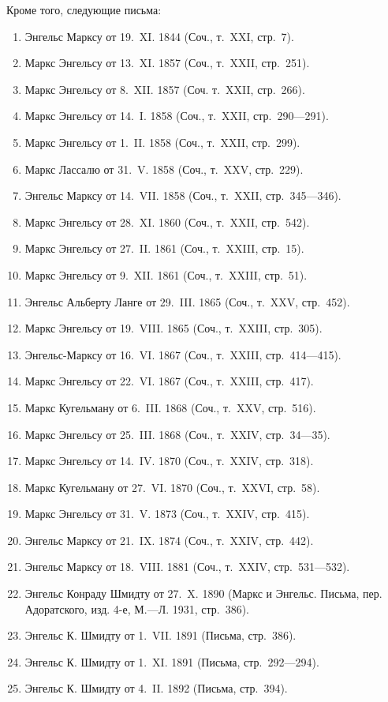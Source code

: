 Кроме того, следующие письма:
\begin{enumerate}
\item Энгельс Марксу от 19.~XI. 1844 (Соч., т.~XXI, стр.~7).
\item Маркс Энгельсу от 13.~XI. 1857 (Соч., т.~XXII, стр.~251).
\item Маркс Энгельсу от 8.~XII. 1857 (Соч. т.~XXII, стр.~266).
\item Маркс Энгельсу от 14.~I. 1858 (Соч., т.~XXII, стр.~290---291).
\item Маркс Энгельсу от 1.~II. 1858 (Соч., т.~XXII, стр.~299).
\item Маркс Лассалю от 31.~V. 1858 (Соч., т.~XXV, стр.~229).
\item Энгельс Марксу от 14.~VII. 1858 (Соч., т.~XXII, стр.~345---346).
\item Маркс Энгельсу от 28.~XI. 1860 (Соч., т.~XXII, стр.~542).
\item Маркс Энгельсу от 27.~II. 1861 (Соч., т.~XXIII, стр.~15).
\item Маркс Энгельсу от 9.~XII. 1861 (Соч., т.~XXIII, стр.~51).
\item Энгельс Альберту Ланге от 29.~III. 1865 (Соч., т.~XXV, стр.~452).
\item Маркс Энгельсу от 19.~VIII. 1865 (Соч., т.~XXIII, стр.~305).
\item Энгельс-Марксу от 16.~VI. 1867 (Соч., т.~XXIII, стр.~414---415).
\item Маркс Энгельсу от 22.~VI. 1867 (Соч., т.~XXIII, стр.~417).
\item Маркс Кугельману от 6.~III. 1868 (Соч., т.~XXV, стр.~516).
\item Маркс Энгельсу от 25.~III. 1868 (Соч., т.~XXIV, стр.~34---35).
\item Маркс Энгельсу от 14.~IV. 1870 (Соч., т.~XXIV, стр.~318).
\item Маркс Кугельману от 27.~VI. 1870 (Соч., т.~XXVI, стр.~58).
\item Маркс Энгельсу от 31.~V. 1873 (Соч., т.~XXIV, стр.~415).
\item Энгельс Марксу от 21.~IX. 1874 (Соч., т.~XXIV, стр.~442).
\item Энгельс Марксу от 18.~VIII. 1881 (Соч., т.~XXIV, стр.~531---532).
\item Энгельс Конраду Шмидту от 27.~X. 1890 (Маркс и Энгельс. Письма,
пер. Адоратского, изд. 4-е, М.---Л. 1931, стр.~386).
\item Энгельс К. Шмидту от 1.~VII. 1891 (Письма, стр.~386).
\item Энгельс К. Шмидту от 1.~XI. 1891 (Письма, стр.~292---294).
\item Энгельс К. Шмидту от 4.~II. 1892 (Письма, стр.~394).
\end{enumerate}

